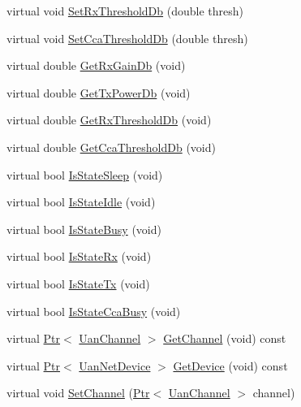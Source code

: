 \begin{DoxyCompactItemize}
\item 
virtual void \hyperlink{classns3_1_1UanPhyDual_ac3caf5f2a8ca297814609f4f7f094cb0}{Set\+Rx\+Threshold\+Db} (double thresh)
\item 
virtual void \hyperlink{classns3_1_1UanPhyDual_acaa0fd13d5bf1e473b345809adbd87c7}{Set\+Cca\+Threshold\+Db} (double thresh)
\item 
virtual double \hyperlink{classns3_1_1UanPhyDual_ac98ac2e773b2f58c3efe51dfb4150897}{Get\+Rx\+Gain\+Db} (void)
\item 
virtual double \hyperlink{classns3_1_1UanPhyDual_aec61f76e5e29b08f76a62f862213e77a}{Get\+Tx\+Power\+Db} (void)
\item 
virtual double \hyperlink{classns3_1_1UanPhyDual_a73ceb5fe4b32a4120238dfaafc0811b0}{Get\+Rx\+Threshold\+Db} (void)
\item 
virtual double \hyperlink{classns3_1_1UanPhyDual_a3f02bbc4a7c671550a6e9545cde61793}{Get\+Cca\+Threshold\+Db} (void)
\item 
virtual bool \hyperlink{classns3_1_1UanPhyDual_a8f9cba82b2e21b34a7729a21849ce94f}{Is\+State\+Sleep} (void)
\item 
virtual bool \hyperlink{classns3_1_1UanPhyDual_a7e0020514508182f94e44a148180d490}{Is\+State\+Idle} (void)
\item 
virtual bool \hyperlink{classns3_1_1UanPhyDual_af850c03e22399ac3d65b4ef5efff1550}{Is\+State\+Busy} (void)
\item 
virtual bool \hyperlink{classns3_1_1UanPhyDual_af169009b2daef1b05db24becf99294e2}{Is\+State\+Rx} (void)
\item 
virtual bool \hyperlink{classns3_1_1UanPhyDual_abed8b4cb9a147c0aea7b0f0ac27589a3}{Is\+State\+Tx} (void)
\item 
virtual bool \hyperlink{classns3_1_1UanPhyDual_aa57cff325a887529c23fcb218152962a}{Is\+State\+Cca\+Busy} (void)
\item 
virtual \hyperlink{classns3_1_1Ptr}{Ptr}$<$ \hyperlink{classns3_1_1UanChannel}{Uan\+Channel} $>$ \hyperlink{classns3_1_1UanPhyDual_a0edca15a97746eae13838c2134cda7e3}{Get\+Channel} (void) const 
\item 
virtual \hyperlink{classns3_1_1Ptr}{Ptr}$<$ \hyperlink{classns3_1_1UanNetDevice}{Uan\+Net\+Device} $>$ \hyperlink{classns3_1_1UanPhyDual_a4c51350a90816b4019fb7379efc7f27b}{Get\+Device} (void) const 
\item 
virtual void \hyperlink{classns3_1_1UanPhyDual_a2832d94feb09eac6a83bc3a28c8fa1f9}{Set\+Channel} (\hyperlink{classns3_1_1Ptr}{Ptr}$<$ \hyperlink{classns3_1_1UanChannel}{Uan\+Channel} $>$ channel)

\end{DoxyCompactItemize}
